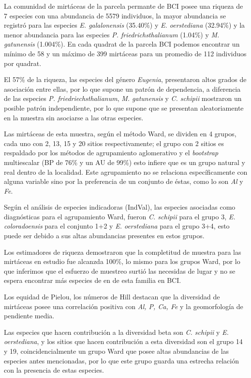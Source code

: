 \documentclass[11pt,]{article}
\begin{document}
La comunidad de mirtáceas de la parcela permante de BCI posee una
riqueza de 7 especies con una abundancia de 5579 individuos, la mayor
abundancia se registró para las especies \emph{E. galalonensis}
(35.40\%) y \emph{E. oerstediana} (32.94\%) y la menor abundancia para
las especies \emph{P. friedrichsthalianum} (1.04\%) y \emph{M.
gatunensis} (1.004\%). En cada quadrat de la parcela BCI podemos
encontrar un mínimo de 58 y un máximo de 399 mirtáceas para un promedio
de 112 individuos por quadrat.

El 57\% de la riqueza, las especies del género \emph{Eugenia},
presentaron altos grados de asociación entre ellas, por lo que supone un
patrón de dependencia, a diferencia de las especies \emph{P.
friedriechsthalianum}, \emph{M. gatunensis} y \emph{C. schipii}
mostraron un posible patrón independiente, por lo que supone que se
presentan aleatoriamente en la muestra sin asociarse a las otras
especies.

Las mirtáceas de esta muestra, según el método Ward, se dividen en 4
grupos, cada uno con 2, 13, 15 y 20 sitios respectivamente; el grupo con
2 sitios es respaldado por los métodos de agrupamiento aglomerativo y el
\emph{bootstrap} multiescalar (BP de 76\% y un AU de 99\%) esto infiere
que es un grupo natural y real dentro de la localidad. Este agrupamiento
no se relaciona específicamente con alguna variable sino por la
preferencia de un conjunto de éstas, como lo son \emph{Al} y \emph{Fe}.

Según el análisis de especies indicadoras (IndVal), las especies
asociadas como diagnósticas para el agrupamiento Ward, fueron \emph{C.
schipii} para el grupo 3, \emph{E. coloradoensis} para el conjunto 1+2 y
\emph{E. oerstediana} para el grupo 3+4, esto puede ser debido a sus
altas abundancias presentes en estos grupos.

Los estimadores de riqueza demostraron que la completitud de muestra
para las mirtáceas en estudio fue alcanzda 100\%, lo mismo para los
grupos Ward, por lo que inferimos que el esfuerzo de muestreo surtió las
necesidas de lugar y no se espera encontrar más especies de en de esta
familia en BCI.

Los equidad de Pielou, los números de Hill destacan que la diversidad de
mirtáceas posee una correlación positiva con \emph{Al, P, Ca, Fe} y la
geomorfología de pendiente media.

Las especies que hacen contribución a la diversidad beta son \emph{C.
schipii} y \emph{E. oerstediana}, y los sitios que hacen contribución a
esta diversidad son el grupo 14 y 19, coincidencialmente un grupo Ward
que posee altas abundancias de las especies antes mencionadas, por lo
que este grupo guarda una estrecha relación con la presencia de estas
especies.
\end{document}
